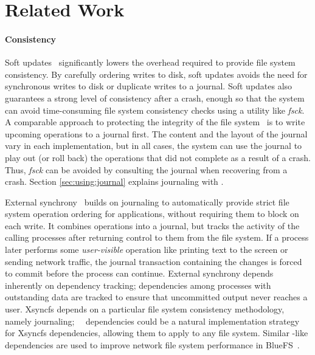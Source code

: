 \section{Related Work}
\label{sec:related}

\paragraph{Consistency}

Soft updates~\cite{ganger00soft} significantly lowers the overhead required to
provide file system consistency. By carefully ordering writes to disk, soft
updates avoids the need for synchronous writes to disk or duplicate writes to
a journal. Soft updates also guarantees a strong level of consistency after a
crash, enough so that the system can avoid time-consuming file system
consistency checks using a utility like \emph{fsck}. 
%
A comparable approach to protecting the integrity of the file
system~\cite{seltzer00journaling} is to write
upcoming operations to a journal first. The content and the layout of the
journal vary in each implementation, but in all cases, the system can use the
journal to play out (or roll back) the operations that did not complete as a
result of a crash. Thus, \emph{fsck} can be avoided by consulting the journal
when recovering from a crash.  Section \ref{sec:using:journal} explains
journaling with \chdescs.

External synchrony~\cite{nightingale06rethink} builds on journaling to
automatically provide strict file system operation ordering for applications,
without requiring them to block on each write. It combines operations into a
journal, but tracks the activity of the calling processes after returning
control to them from the file system. If a process later performs some
\emph{user-visible} operation like printing text to the screen or sending
network traffic, the journal transaction containing the changes is forced to
commit before the process can continue.
%
External synchrony depends inherently on dependency tracking; dependencies
among processes with outstanding data are tracked to ensure that
uncommitted output never reaches a user.  Xsyncfs depends on a particular
file system consistency methodology, namely journaling; \Kudos\ \patch\
dependencies could be a natural implementation strategy for Xsyncfs
dependencies, allowing them to apply to any file system.
%
Similar \patch-like dependencies are used to improve network file system
performance in BlueFS~\cite{nightingale05speculative}.

